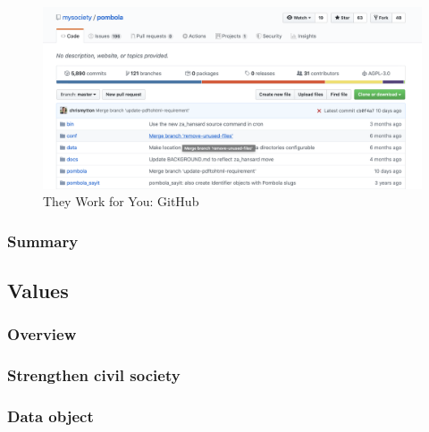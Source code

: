 \documentclass{article}
\begin{document}
			\begin{figure}
				\centering
				\includegraphics[scale=0.4]{images/they-work-for-you-implementation-open-source-github}
				\caption{They Work for You: GitHub}
				\label{fig:they-work-for-you-implementation-open-source-github}
			\end{figure}
						
        	\subsubsection*{Summary}
        	
        	        	          	  
        \subsection*{Values}

        	\subsubsection*{Overview}
        	

        	\subsubsection*{Strengthen civil society}
        	

        	\subsubsection*{Data object}
        	
\end{document}

